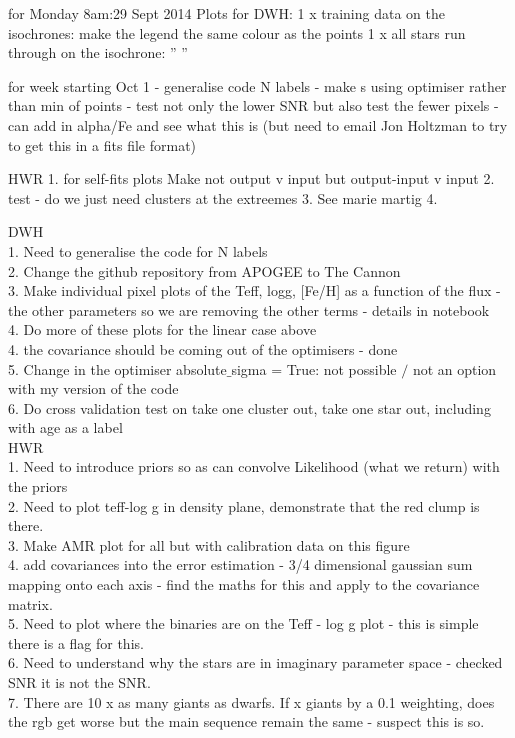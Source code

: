 \documentclass[12pt, preprint]{aastex}
\begin{document}
for Monday 8am:29 Sept 2014
Plots for DWH: 
1 x training data on the isochrones: make the legend the same colour as the points
1 x all stars run through on the isochrone: '' '' 

for week starting Oct 1 
- generalise code N labels
- make s using optimiser rather than min of points 
- test not only the lower SNR but also test the fewer pixels 
- can add in alpha/Fe and see what this is (but need to email Jon Holtzman to try to get this in a fits file format) 

HWR
1. for self-fits plots Make not output v input but output-input v input
2. test - do we just need clusters at the extreemes
3. See marie martig
4. 



DWH\\
 
1. Need to generalise the code for N labels\\
2. Change the github repository from APOGEE to The Cannon\\
3. Make individual pixel plots of the Teff, logg, [Fe/H] as a function of the flux - the other parameters so we are removing the other terms - details in notebook\\
4. Do more of these plots for the linear case above\\
4. the covariance should be coming out of the optimisers - done\\
5. Change in the optimiser absolute$\_$sigma = True: not possible $/$ not an option with my version of the code\\
6. Do cross validation test on take one cluster out, take one star out, including with age as a label\\

HWR \\
1. Need to introduce priors so as can convolve Likelihood (what we return) with the priors\\
2. Need to plot teff-log g in density plane, demonstrate that the red clump is there.\\
3. Make AMR plot for all but with calibration data on this figure\\
4. add covariances into the error estimation - 3/4 dimensional gaussian sum mapping onto each axis - find the maths for this and apply to the covariance matrix.\\
5. Need to plot where the binaries are on the Teff - log g plot - this is simple there is a flag for this.\\
6. Need to understand why the stars are in imaginary parameter space - checked SNR it is not the SNR.\\
7. There are 10 x as many giants as dwarfs. If x giants by a 0.1 weighting, does the rgb get worse but the main sequence remain the same - suspect this is so.\\
\end{document}
